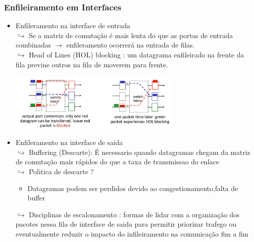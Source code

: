         \subsubsection*{Enfileiramento em Interfaces}    

            \begin{itemize}[left=0.5cm, align=left, nosep]
                \item Enfileramento na interface de entrada \\
                    $\hookrightarrow$ Se a matriz de comutação é mais lenta do que as portas de entrada combinadas $\rightarrow$ enfileramento ocorrerá na entrada de filas. \\
                    $\hookrightarrow$ Head of Lines (HOL) blocking : um datagrama enfileirado na frente da fila previne outros na fila de moverem para frente.     

                    \begin{center}
                        \includegraphics[width=0.65\textwidth]{img/cap-04/hol.png}
                    \end{center}

                \item Enfileramento na interface de saida \\
                    $\hookrightarrow$ Buffering (Descarte): É necessario quando datagramas chegam da matriz de comutação mais rápidos do que a taxa de transmissao do enlace \\
                    $\hookrightarrow$ Politica de descarte ? 
                        \begin{itemize}[left=0.5cm, align=left, nosep]
                            \item Datagramas podem ser perdidos devido ao congestionamento,falta de buffer
                        \end{itemize}
                    $\hookrightarrow$ Disciplinas de escalonamento : formas de lidar com a organização dos pacotes nessa fila de interface de saida para permitir priorizar trafego ou eventualmente reduzir o impacto do infileiramento na comunicação fim a fim     
                       

\end{itemize}
